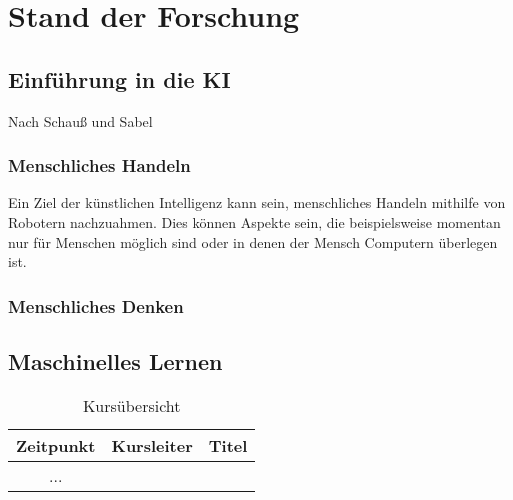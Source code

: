 \chapter{Stand der Forschung}
\section{Einführung in die KI}
Nach Schauß und Sabel
\subsection{Menschliches Handeln}
Ein Ziel der künstlichen Intelligenz kann sein, menschliches Handeln mithilfe von Robotern nachzuahmen. Dies können Aspekte sein, die beispielsweise momentan nur für Menschen möglich sind oder in denen der Mensch Computern überlegen ist.    

\subsection{Menschliches Denken}


\section{Maschinelles Lernen}

\begin{table}
\caption{ Kursübersicht}
\begin{tabular}{|c|c|c|}
\hline
Zeitpunkt & Kursleiter & Titel \\
\hline 
 ...   
\end{tabular}
\end{table}
